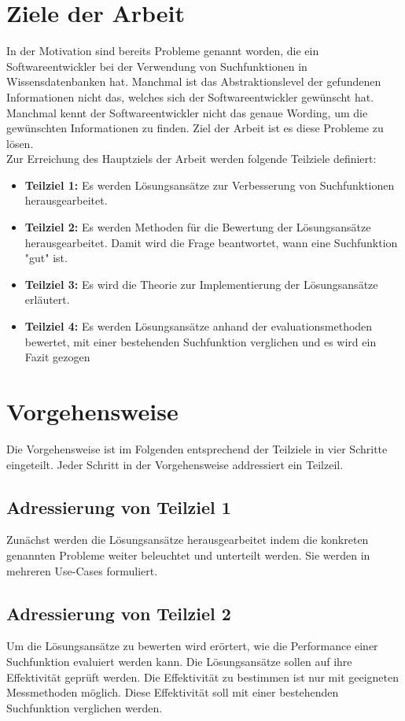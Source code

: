 \section{Ziele der Arbeit}
In der Motivation sind bereits Probleme genannt worden, die ein Softwareentwickler bei der Verwendung von Suchfunktionen in Wissensdatenbanken hat.
Manchmal ist das Abstraktionslevel der gefundenen Informationen nicht das, welches sich der Softwareentwickler gewünscht hat.
Manchmal kennt der Softwareentwickler nicht das genaue Wording, um die gewünschten Informationen zu finden.
Ziel der Arbeit ist es diese Probleme zu lösen.\\

Zur Erreichung des Hauptziels der Arbeit werden folgende Teilziele definiert:
\begin{itemize}
   \item \textbf{Teilziel 1:}
   Es werden Lösungsansätze zur Verbesserung von Suchfunktionen herausgearbeitet. 
   \item \textbf{Teilziel 2:}
   Es werden Methoden für die Bewertung der Lösungsansätze herausgearbeitet.
   Damit wird die Frage beantwortet, wann eine Suchfunktion "gut" ist. 
   \item \textbf{Teilziel 3:}
   Es wird die Theorie zur Implementierung der Lösungsansätze erläutert.
   \item \textbf{Teilziel 4:}
   Es werden Lösungsansätze anhand der evaluationsmethoden bewertet, mit einer bestehenden Suchfunktion verglichen und es wird ein Fazit gezogen
\end{itemize}

\section{Vorgehensweise}
Die Vorgehensweise ist im Folgenden entsprechend der Teilziele in vier Schritte eingeteilt.
Jeder Schritt in der Vorgehensweise addressiert ein Teilzeil. 

\subsection*{Adressierung von Teilziel 1}
Zunächst werden die Lösungsansätze herausgearbeitet indem die konkreten genannten Probleme weiter beleuchtet und unterteilt werden.
Sie werden in mehreren Use-Cases formuliert.

\subsection*{Adressierung von Teilziel 2}
Um die Lösungsansätze zu bewerten wird erörtert, wie die Performance einer Suchfunktion evaluiert werden kann.
Die Lösungsansätze sollen auf ihre Effektivität geprüft werden.
Die Effektivität zu bestimmen ist nur mit geeigneten Messmethoden möglich.
Diese Effektivität soll mit einer bestehenden Suchfunktion verglichen werden.

